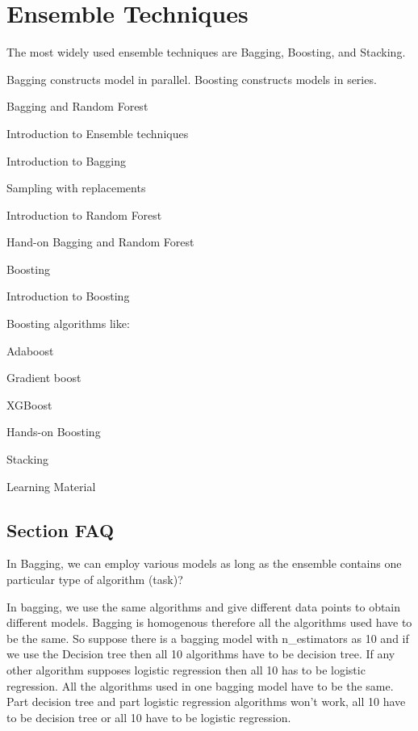 	\chapter{Ensemble Techniques}
The most widely used ensemble techniques are Bagging, Boosting, and Stacking.

Bagging constructs model in parallel.  Boosting constructs models in series.

	\begin{bulletedlist}
		\item Bagging and Random Forest
		\begin{bulletedlist}
			\item Introduction to Ensemble techniques
			\item Introduction to Bagging
			\item Sampling with replacements
			\item Introduction to Random Forest
			\item Hand-on Bagging and Random Forest
		\end{bulletedlist}
		\item Boosting
		\begin{bulletedlist}
			\item Introduction to Boosting
			\item Boosting algorithms like:
			\item Adaboost
			\item Gradient boost
			\item XGBoost
			\item Hands-on Boosting
			\item Stacking
			\item Learning Material
		\end{bulletedlist}
	\end{bulletedlist}


	\section{Section FAQ}

	\resetquestioncounter{}
    \begin{qanda}
		\begin{question}
In Bagging, we can employ various models as long as the ensemble contains one particular type of algorithm (task)?
		\end{question}

		\begin{answer}
In bagging, we use the same algorithms and give different data points to obtain different models.  Bagging is homogenous therefore all the algorithms used have to be the same.  So suppose there is a bagging model with n\_estimators as 10 and if we use the Decision tree then all 10 algorithms have to be decision tree.  If any other algorithm supposes logistic regression then all 10 has to be logistic regression.  All the algorithms used in one bagging model have to be the same.  Part decision tree and part logistic regression algorithms won't work, all 10 have to be decision tree or all 10 have to be logistic regression.
		\end{answer}
    \end{qanda}

